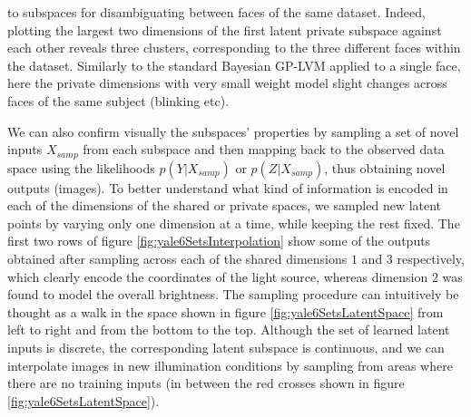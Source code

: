 to subspaces for disambiguating between faces of the same dataset.
Indeed, plotting the largest two dimensions of the first latent
private subspace against each other reveals three clusters,
corresponding to the three different faces within the dataset.
Similarly to the standard Bayesian GP-LVM applied to a single face,
here the private dimensions with very small weight model slight changes
across faces of the same subject (blinking etc).
%
%

We can also confirm visually the subspaces' properties by sampling a
set of novel inputs $X_{samp}$ from each subspace and then mapping
back to the observed data space using the likelihoods $p(Y|X_{samp})$ or $p(Z|X_{samp})$,
thus obtaining novel outputs (images).
To better understand what kind of information is encoded in each of
the dimensions of the shared or private spaces, we sampled new latent
points by varying only one dimension at a time, while keeping the rest
fixed.
%
The first two rows of figure \ref{fig:yale6SetsInterpolation} show
some of the outputs obtained after sampling across each of the shared
dimensions $1$ and $3$ respectively, which clearly encode the
coordinates of the light source, whereas dimension $2$ was found to
model the overall brightness. The sampling procedure can intuitively
be thought as a walk in the space shown in figure
\ref{fig:yale6SetsLatentSpace} from left to
right and from the bottom to the top. Although the set of learned
latent inputs is discrete, the corresponding latent subspace is
continuous, and we can interpolate images in new illumination
conditions by sampling from areas where there are no training inputs
(\ie in between the red crosses shown in figure
\ref{fig:yale6SetsLatentSpace}).

